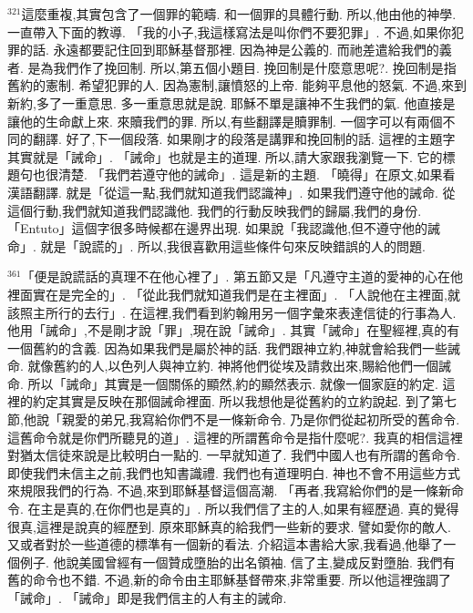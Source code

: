 \documentclass{book}
\begin{document}
$^{321}$這麼重複,其實包含了一個罪的範疇.
和一個罪的具體行動.
所以,他由他的神學.
一直帶入下面的教導.
「我的小子,我這樣寫法是叫你們不要犯罪」.
不過,如果你犯罪的話.
永遠都要記住回到耶穌基督那裡.
因為神是公義的.
而祂差遣給我們的義者.
是為我們作了挽回制.
所以,第五個小題目.
挽回制是什麼意思呢?.
挽回制是指舊約的憲制.
希望犯罪的人.
因為憲制,讓憤怒的上帝.
能夠平息他的怒氣.
不過,來到新約,多了一重意思.
多一重意思就是說.
耶穌不單是讓神不生我們的氣.
他直接是讓他的生命獻上來.
來贖我們的罪.
所以,有些翻譯是贖罪制.
一個字可以有兩個不同的翻譯.
好了,下一個段落.
如果剛才的段落是講罪和挽回制的話.
這裡的主題字其實就是「誡命」.
「誡命」也就是主的道理.
所以,請大家跟我瀏覽一下.
它的標題句也很清楚.
「我們若遵守他的誡命」.
這是新的主題.
「曉得」在原文,如果看漢語翻譯.
就是「從這一點,我們就知道我們認識神」.
如果我們遵守他的誡命.
從這個行動,我們就知道我們認識他.
我們的行動反映我們的歸屬,我們的身份.
「Entuto」這個字很多時候都在邊界出現.
如果說「我認識他,但不遵守他的誡命」.
就是「說謊的」.
所以,我很喜歡用這些條件句來反映錯誤的人的問題.

$^{361}$「便是說謊話的真理不在他心裡了」.
第五節又是「凡遵守主道的愛神的心在他裡面實在是完全的」.
「從此我們就知道我們是在主裡面」.
「人說他在主裡面,就該照主所行的去行」.
在這裡,我們看到約翰用另一個字彙來表達信徒的行事為人.
他用「誡命」,不是剛才說「罪」,現在說「誡命」.
其實「誡命」在聖經裡,真的有一個舊約的含義.
因為如果我們是屬於神的話.
我們跟神立約,神就會給我們一些誡命.
就像舊約的人,以色列人與神立約.
神將他們從埃及請救出來,賜給他們一個誡命.
所以「誡命」其實是一個關係的顯然,約的顯然表示.
就像一個家庭的約定.
這裡的約定其實是反映在那個誡命裡面.
所以我想他是從舊約的立約說起.
到了第七節,他說「親愛的弟兄,我寫給你們不是一條新命令.
乃是你們從起初所受的舊命令.
這舊命令就是你們所聽見的道」.
這裡的所謂舊命令是指什麼呢?.
我真的相信這裡對猶太信徒來說是比較明白一點的.
一早就知道了.
我們中國人也有所謂的舊命令.
即使我們未信主之前,我們也知書識禮.
我們也有道理明白.
神也不會不用這些方式來規限我們的行為.
不過,來到耶穌基督這個高潮.
「再者,我寫給你們的是一條新命令.
在主是真的,在你們也是真的」.
所以我們信了主的人,如果有經歷過.
真的覺得很真,這裡是說真的經歷到.
原來耶穌真的給我們一些新的要求.
譬如愛你的敵人.
又或者對於一些道德的標準有一個新的看法.
介紹這本書給大家,我看過,他舉了一個例子.
他說美國曾經有一個贊成墮胎的出名領袖.
信了主,變成反對墮胎.
我們有舊的命令也不錯.
不過,新的命令由主耶穌基督帶來,非常重要.
所以他這裡強調了「誡命」.
「誡命」即是我們信主的人有主的誡命.
\end{document}
